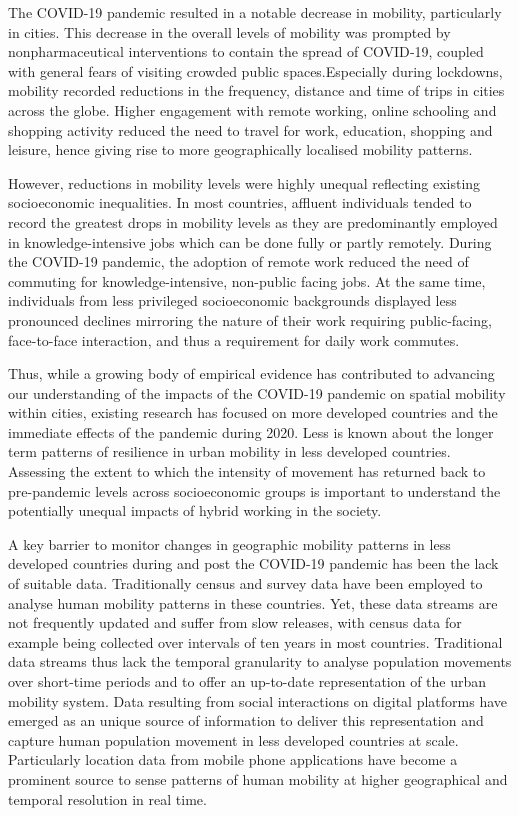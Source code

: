 \documentclass[
  11pt,
]{article}
\begin{document}
The COVID-19 pandemic resulted in a notable decrease in mobility,
particularly in cities. This decrease in the overall levels of mobility
was prompted by nonpharmaceutical interventions to contain the spread of
COVID‐19, coupled with general fears of visiting crowded public
spaces.Especially during lockdowns, mobility recorded reductions in the
frequency, distance and time of trips in cities across the globe. Higher
engagement with remote working, online schooling and shopping activity
reduced the need to travel for work, education, shopping and leisure,
hence giving rise to more geographically localised mobility patterns.

However, reductions in mobility levels were highly unequal reflecting
existing socioeconomic inequalities. In most countries, affluent
individuals tended to record the greatest drops in mobility levels as
they are predominantly employed in knowledge-intensive jobs which can be
done fully or partly remotely. During the COVID-19 pandemic, the
adoption of remote work reduced the need of commuting for
knowledge-intensive, non-public facing jobs. At the same time,
individuals from less privileged socioeconomic backgrounds displayed
less pronounced declines mirroring the nature of their work requiring
public-facing, face-to-face interaction, and thus a requirement for
daily work commutes.

Thus, while a growing body of empirical evidence has contributed to
advancing our understanding of the impacts of the COVID-19 pandemic on
spatial mobility within cities, existing research has focused on more
developed countries and the immediate effects of the pandemic during
2020. Less is known about the longer term patterns of resilience in
urban mobility in less developed countries. Assessing the extent to
which the intensity of movement has returned back to pre-pandemic levels
across socioeconomic groups is important to understand the potentially
unequal impacts of hybrid working in the society.

A key barrier to monitor changes in geographic mobility patterns in less
developed countries during and post the COVID-19 pandemic has been the
lack of suitable data. Traditionally census and survey data have been
employed to analyse human mobility patterns in these countries. Yet,
these data streams are not frequently updated and suffer from slow
releases, with census data for example being collected over intervals of
ten years in most countries. Traditional data streams thus lack the
temporal granularity to analyse population movements over short-time
periods and to offer an up-to-date representation of the urban mobility
system. Data resulting from social interactions on digital platforms
have emerged as an unique source of information to deliver this
representation and capture human population movement in less developed
countries at scale. Particularly location data from mobile phone
applications have become a prominent source to sense patterns of human
mobility at higher geographical and temporal resolution in real time.
\end{document}
